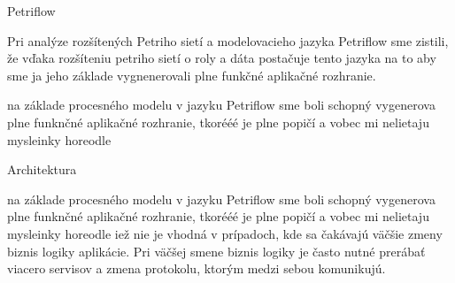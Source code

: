 

Petriflow

Pri analýze rozšítených Petriho sietí a modelovacieho jazyka Petriflow sme zistili, že vďaka rozšíteniu petriho sietí o roly a dáta postačuje tento jazyka na to aby sme ja jeho základe vygnenerovali plne funkčné aplikačné rozhranie.

na základe procesného modelu v jazyku Petriflow sme boli schopný vygenerova plne funknčné aplikačné rozhranie, tkorééé je plne popičí a vobec mi nelietaju mysleinky horeodle 

Architektura

na základe procesného modelu v jazyku Petriflow sme boli schopný vygenerova plne funknčné aplikačné rozhranie, tkorééé je plne popičí a vobec mi nelietaju mysleinky horeodle iež nie je vhodná v prípadoch, kde sa čakávajú väčšie zmeny biznis logiky aplikácie. Pri väčšej smene biznis logiky je často nutné prerábať viacero servisov a zmena protokolu, ktorým medzi sebou komunikujú.   

